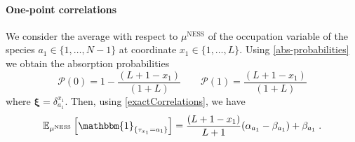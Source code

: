 \documentclass[10pt]{article}
\numberwithin{equation}{section}
\numberwithin{equation}{subsection}
\newcommand{\dt}{\;.}
\begin{document}
\paragraph{One-point correlations}
We consider the average with respect to $\mu^{\text{NESS}}$ of the occupation variable of the species $a_{1}\in \{1,\ldots,N-1\}$ at coordinate $x_{1}\in \{1,\ldots,L\}$. %
Using \eqref{abs-probabilities} we obtain the absorption probabilities 
\begin{equation}
	\mathcal{P}(0)=1-\frac{(L+1-x_{1})}{(1+L)}\qquad \mathcal{P}(1)=\frac{(L+1-x_{1})}{(1+L)}
\end{equation} 
where $\bm{\xi}=\delta_{a_{1}}^{x_{1}}$. Then, using \eqref{exactCorrelations}, we have
\begin{equation}\label{one-pts-corr}
	 \mathbb{E}_{\mu^{\text{NESS}}}\left[\mathbbm{1}_{\{\tau_{x_{1}}=a_{1}\}}\right]=\frac{(L+1-x_{1})}{L+1}(\alpha_{a_{1}}-\beta_{a_{1}})+\beta_{a_{1}}\dt
\end{equation}
\end{document}
